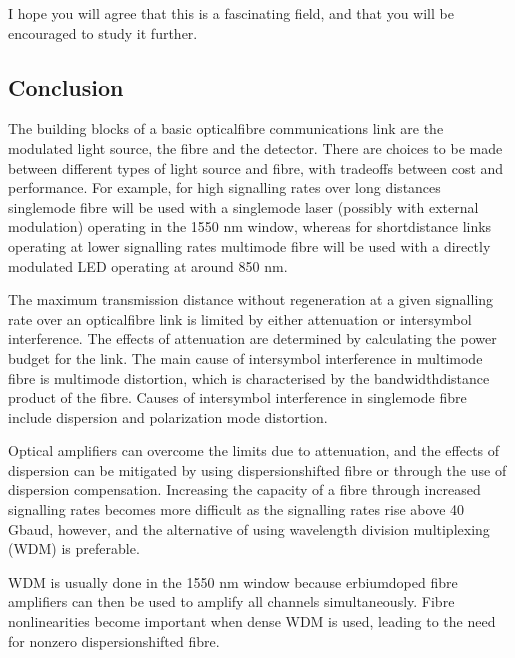 \documentclass[letterpaper,10pt,english]{sphinxmanual}
\begin{document}
I hope you will agree that this is a fascinating field, and that you will be encouraged to study it further.


\subsection{Conclusion}
\label{\detokenize{content/session_00/Part_00_05:Conclusion}}\label{\detokenize{content/session_00/Part_00_05::doc}}
The building blocks of a basic optical\sphinxhyphen{}fibre communications link are the modulated light source, the fibre and the detector. There are choices to be made between different types of light source and fibre, with trade\sphinxhyphen{}offs between cost and performance. For example, for high signalling rates over long distances single\sphinxhyphen{}mode fibre will be used with a single\sphinxhyphen{}mode laser (possibly with external modulation) operating in the 1550 nm window, whereas for short\sphinxhyphen{}distance links operating at lower signalling
rates multimode fibre will be used with a directly modulated LED operating at around 850 nm.

The maximum transmission distance without regeneration at a given signalling rate over an optical\sphinxhyphen{}fibre link is limited by either attenuation or inter\sphinxhyphen{}symbol interference. The effects of attenuation are determined by calculating the power budget for the link. The main cause of inter\sphinxhyphen{}symbol interference in multimode fibre is multimode distortion, which is characterised by the bandwidth\sphinxhyphen{}distance product of the fibre. Causes of inter\sphinxhyphen{}symbol interference in single\sphinxhyphen{}mode fibre include dispersion and
polarization mode distortion.

Optical amplifiers can overcome the limits due to attenuation, and the effects of dispersion can be mitigated by using dispersion\sphinxhyphen{}shifted fibre or through the use of dispersion compensation. Increasing the capacity of a fibre through increased signalling rates becomes more difficult as the signalling rates rise above 40 Gbaud, however, and the alternative of using wavelength division multiplexing (WDM) is preferable.

WDM is usually done in the 1550 nm window because erbium\sphinxhyphen{}doped fibre amplifiers can then be used to amplify all channels simultaneously. Fibre non\sphinxhyphen{}linearities become important when dense WDM is used, leading to the need for non\sphinxhyphen{}zero dispersion\sphinxhyphen{}shifted fibre.
\end{document}
